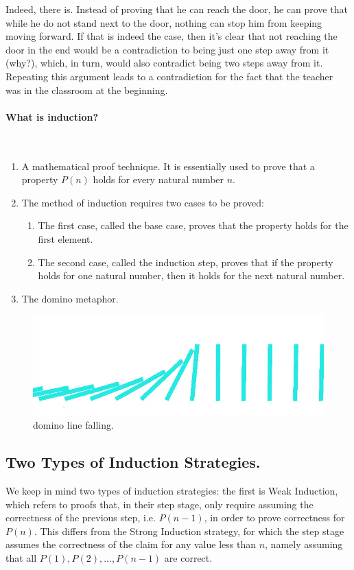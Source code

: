 Indeed, there is. Instead of proving that he can reach the door, he can prove that while he do not stand next to the door, nothing can stop him from keeping moving forward. If that is indeed the case, then it's clear that not reaching the door in the end would be a contradiction to being just one step away from it (why?), which, in turn, would also contradict being two steps away from it. Repeating this argument leads to a contradiction for the fact that the teacher was in the classroom at the beginning.

\paragraph{What is induction?}~\begin{enumerate}
    \item A mathematical proof technique. It is essentially used to prove that a property \(P(n)\) holds for every natural number \(n\).
    \item The method of induction requires two cases to be proved:
    \begin{enumerate}
        \item The first case, called the base case, proves that the property holds for the first element.
        \item The second case, called the induction step, proves that if the property holds for one natural number, then it holds for the next natural number.
    \end{enumerate}
    \item The domino metaphor. 
\end{enumerate}

\begin{figure}[h]
  \centering
  \includegraphics[scale=4.5]{./dommino-256x256}
  \caption{ domino line falling.}
  \label{fig:domino}
\end{figure}



\subsection{Two Types of Induction Strategies.}
We keep in mind two types of induction strategies: the first is Weak Induction, which refers to proofs that, in their step stage, only require assuming the correctness of the previous step, i.e. $P(n-1)$, in order to prove correctness for $P(n)$. This differs from the Strong Induction strategy, for which the step stage assumes the correctness of the claim for any value less than $n$, namely assuming that all $P(1), P(2), ..., P(n-1)$ are correct.


